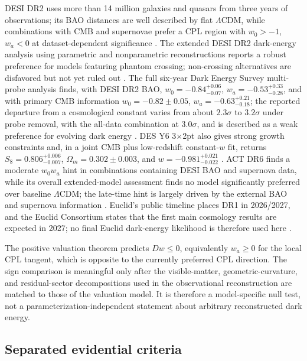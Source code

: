 \documentclass[11pt,a4paper]{article}
\def\Dil{D}%
\numberwithin{equation}{section}
\theoremstyle{definition}
\theoremstyle{plain}
\theoremstyle{remark}
\newcommand{\Dil}{\mathscr{D}}
\begin{document}
DESI DR2 uses more than 14 million galaxies and quasars from three years of observations; its BAO distances are well described by flat \(\Lambda\)CDM, while combinations with CMB and supernovae prefer a CPL region with \(w_0>-1\), \(w_a<0\) at dataset-dependent significance \cite{DESI2025DR2BAO}. The extended DESI DR2 dark-energy analysis using parametric and nonparametric reconstructions reports a robust preference for models featuring phantom crossing; non-crossing alternatives are disfavored but not yet ruled out \cite{DESIExtendedDE2025}. The full six-year Dark Energy Survey multi-probe analysis finds, with DESI DR2 BAO, \(w_0=-0.84^{+0.06}_{-0.07}\), \(w_a=-0.53^{+0.33}_{-0.28}\), and with primary CMB information \(w_0=-0.82\pm0.05\), \(w_a=-0.63^{+0.21}_{-0.18}\); the reported departure from a cosmological constant varies from about \(2.3\sigma\) to \(3.2\sigma\) under probe removal, with the all-data combination at \(3.0\sigma\), and is described as a weak preference for evolving dark energy \cite{DESY6DynamicalDE2026}. DES Y6 3\(\times\)2pt also gives strong growth constraints and, in a joint CMB plus low-redshift constant-\(w\) fit, returns \(S_8=0.806^{+0.006}_{-0.007}\), \(\Omega_m=0.302\pm0.003\), and \(w=-0.981^{+0.021}_{-0.022}\) \cite{DESY6ThreeByTwo2026}. ACT DR6 finds a moderate \(w_0w_a\) hint in combinations containing DESI BAO and supernova data, while its overall extended-model assessment finds no model significantly preferred over baseline \(\Lambda\)CDM; the late-time hint is largely driven by the external BAO and supernova information \cite{ACTDR6Extended2025}. Euclid's public timeline places DR1 in 2026/2027, and the Euclid Consortium states that the first main cosmology results are expected in 2027; no final Euclid dark-energy likelihood is therefore used here \cite{EuclidTimeline2026,EuclidCosmology2026}.

The positive valuation theorem predicts \(\Dil w\le0\), equivalently \(w_a\ge0\) for the local CPL tangent, which is opposite to the currently preferred CPL direction. The sign comparison is meaningful only after the visible-matter, geometric-curvature, and residual-sector decompositions used in the observational reconstruction are matched to those of the valuation model. It is therefore a model-specific null test, not a parameterization-independent statement about arbitrary reconstructed dark energy.

\subsection{Separated evidential criteria}
\end{document}
